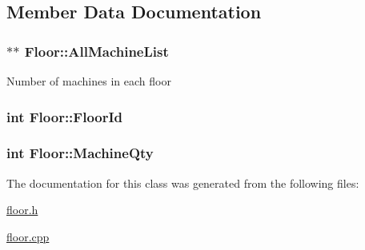 \subsection{Member Data Documentation}
\hypertarget{classFloor_a654069a23fdc0108f72824e91e12f416}{}
\subsubsection[{All\+Machine\+List}]{$\ast$$\ast$ Floor\+::\+All\+Machine\+List\hspace{0.3cm}{\ttfamily [private]}}\label{classFloor_a654069a23fdc0108f72824e91e12f416}
Number of machines in each floor \hypertarget{classFloor_a0a49a73667bcc6f03bd12a327961c2c9}{}
\subsubsection[{Floor\+Id}]{\setlength{\rightskip}{0pt plus 5cm}int Floor\+::\+Floor\+Id\hspace{0.3cm}{\ttfamily [private]}}\label{classFloor_a0a49a73667bcc6f03bd12a327961c2c9}
\hypertarget{classFloor_a1d1b0459a2779b9ebe10b0638dd7e673}{}
\subsubsection[{Machine\+Qty}]{\setlength{\rightskip}{0pt plus 5cm}int Floor\+::\+Machine\+Qty\hspace{0.3cm}{\ttfamily [private]}}\label{classFloor_a1d1b0459a2779b9ebe10b0638dd7e673}


The documentation for this class was generated from the following files\+:\begin{DoxyCompactItemize}
\item 
\hyperlink{floor_8h}{floor.\+h}\item 
\hyperlink{floor_8cpp}{floor.\+cpp}\end{DoxyCompactItemize}
